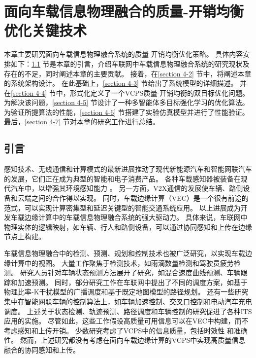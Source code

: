 \chapter[面向车载信息物理融合的质量-开销均衡优化关键技术]{面向车载信息物理融合的质量-开销均衡优化关键技术}

本章主要研究面向车载信息物理融合系统的质量-开销均衡优化策略。
具体内容安排如下：\ref{section 4-1} 节是本章的引言，介绍车联网中车载信息物理融合系统的研究现状及存在的不足，同时阐述本章的主要贡献。
接着，在\ref{section 4-2} 节中，将阐述本章的系统架构设计。
在此基础上，\ref{section 4-3} 节给出了系统模型的详细描述。
并在\ref{section 4-4} 节中，形式化定义了一个VCPS质量-开销均衡的双目标优化问题。
为解决该问题，\ref{section 4-5} 节设计了一种多智能体多目标强化学习的优化算法。
为验证所提算法的性能，\ref{section 4-6} 节搭建了实验仿真模型并进行了性能验证。
最后，\ref{section 4-7} 节对本章的研究工作进行总结。

\section{引言}\label{section 4-1}

感知技术、无线通信和计算模式的最新进展推动了现代新能源汽车和智能网联汽车的发展，它们正在成为典型的智能和电子消费产品。
各种车载感知器被装备在现代汽车中，以增强其环境感知能力 \cite{zhu2017overview}。
另一方面，V2X通信\cite{chen2020a}的发展使车辆、路侧设备和云端之间的合作得以实现。
同时，车载边缘计算（VEC）\cite{dai2021edge}是一个很有前途的范式，可以实现计算密集型和延迟关键型的智能交通系统应用\cite{zhao2022foundation}。
以上进展成为开发车载边缘计算中的车载信息物理融合系统的强大驱动力。
具体来说，车联网中物理实体的逻辑映射，如车辆、行人和路侧设备，可以通过协同感知和上传在边缘节点上构建。

车载信息物理融合中的检测、预测、规划和控制技术也被广泛研究，以实现车载边缘计算中的视图。
大量工作聚焦于检测技术，如雨滴数量检测\cite{wang2021deep}和驾驶员疲劳检测\cite{chang2018design}。
研究人员针对车辆状态预测方法展开了研究，如混合速度曲线预测\cite{zhang2019a}、车辆跟踪\cite{iepure2021a}和加速预测\cite{zhang2020data}。
同时，部分研究工作在车联网中提出了不同的调度方案，如基于物理比率-K干扰模型的广播调度\cite{li2020cyber}和基于既定地图模型的路径规划\cite{lian2021cyber}。
还有一些研究集中在智能网联车辆的控制算法上，如车辆加速控制\cite{lv2018driving}、交叉口控制\cite{chang2021an}和电动汽车充电调度\cite{wi2013electric}。
上述关于状态检测、轨迹预测、路径调度和车辆控制的研究促进了各种ITS应用的实施。
尽管如此，这些工作假设高质量可用信息可以在VEC中构建，而不考虑感知和上传开销。
少数研究考虑了VCPS中的信息质量，包括时效性\cite{liu2014temporal, dai2019temporal} 和准确性\cite{rager2017scalability, yoon2021performance}。
然而，上述研究都没有考虑在面向车载边缘计算的VCPS中实现高质量信息融合的协同感知和上传。

